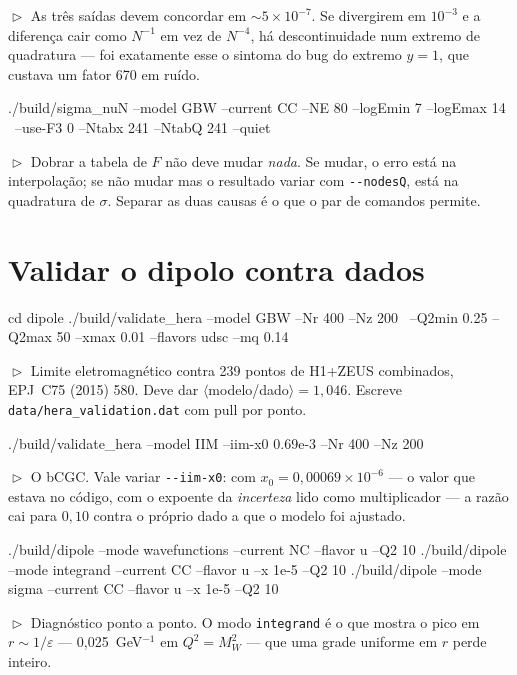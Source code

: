 \documentclass[10pt,a4paper]{article}
\newcommand{\teste}[1]{%
  \par\vspace{1pt}\noindent
  {\color{verde}\footnotesize$\vartriangleright$}\hspace{3pt}%
  {\color{cinza}\footnotesize #1}\par\vspace{7pt}}
\begin{document}
\teste{As três saídas devem concordar em $\sim 5\times10^{-7}$. Se
divergirem em $10^{-3}$ e a diferença cair como $N^{-1}$ em vez de
$N^{-4}$, há descontinuidade num extremo de quadratura --- foi
exatamente esse o sintoma do bug do extremo $y=1$, que custava um fator
670 em ruído.}

\begin{comando}
./build/sigma_nuN --model GBW --current CC --NE 80 --logEmin 7 --logEmax 14 \
    --use-F3 0 --Ntabx 241 --NtabQ 241 --quiet
\end{comando}
\teste{Dobrar a tabela de $F$ não deve mudar \emph{nada}. Se mudar, o
erro está na interpolação; se não mudar mas o resultado variar com
\texttt{-{}-nodesQ}, está na quadratura de $\sigma$. Separar as duas
causas é o que o par de comandos permite.}

\section{Validar o dipolo contra dados}

\begin{comando}
cd dipole
./build/validate_hera --model GBW --Nr 400 --Nz 200 \
    --Q2min 0.25 --Q2max 50 --xmax 0.01 --flavors udsc --mq 0.14
\end{comando}
\teste{Limite eletromagnético contra 239 pontos de H1+ZEUS combinados,
EPJ~C75 (2015) 580. Deve dar $\langle$modelo/dado$\rangle = 1{,}046$.
Escreve \texttt{data/hera\_validation.dat} com pull por ponto.}

\begin{comando}
./build/validate_hera --model IIM --iim-x0 0.69e-3 --Nr 400 --Nz 200
\end{comando}
\teste{O bCGC. Vale variar \texttt{-{}-iim-x0}: com
$x_0 = 0{,}00069\times 10^{-6}$ --- o valor que estava no código, com o
expoente da \emph{incerteza} lido como multiplicador --- a razão cai para
$0{,}10$ contra o próprio dado a que o modelo foi ajustado.}

\begin{comando}
./build/dipole --mode wavefunctions --current NC --flavor u --Q2 10
./build/dipole --mode integrand --current CC --flavor u --x 1e-5 --Q2 10
./build/dipole --mode sigma --current CC --flavor u --x 1e-5 --Q2 10
\end{comando}
\teste{Diagnóstico ponto a ponto. O modo \texttt{integrand} é o que
mostra o pico em $r \sim 1/\varepsilon$ --- 0,025~GeV$^{-1}$ em
$Q^2 = M_W^2$ --- que uma grade uniforme em $r$ perde inteiro.}
\end{document}

